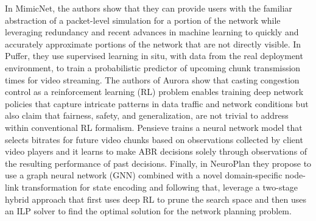 In MimicNet\cite{zhangMimicNetFastPerformance2021}, the authors  show that they can provide users with the familiar abstraction of a packet-level simulation for a portion of the network while leveraging redundancy and recent advances in machine learning to quickly and accurately approximate portions of the network that are not directly visible. In Puffer\cite{puffer},  they use supervised learning in situ, with data from the real deployment environment, to train a probabilistic predictor of upcoming chunk transmission times for video streaming. The authors of Aurora\cite{jayDeepReinforcementLearning2019} show that casting congestion control as a reinforcement learning (RL) problem enables training deep network policies that capture intricate patterns in data traffic and network conditions but also claim that fairness, safety, and generalization, are not trivial to address within conventional RL formalism. Pensieve\cite{maoNeuralAdaptiveVideo2017} trains a neural network model that selects bitrates for future video chunks based on observations collected by client video players and  it learns to make ABR decisions solely through observations of the resulting performance of past decisions. Finally, in NeuroPlan\cite{planning} they propose to use a graph neural network (GNN) combined with a novel domain-specific node-link transformation for state encoding and following that, leverage a two-stage hybrid approach that first uses deep RL to prune the search space and then uses an ILP solver to find the optimal solution for the network planning problem.





